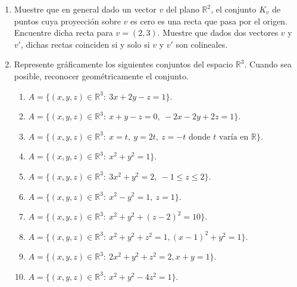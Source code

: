 \documentclass[11pt]{article}
\newcounter{cuent}
\newcommand{\proba}[1]{\stepcounter{cuent}{\alph{cuent})\ }
\displaystyle#1\hfill}
\newcommand{\cuento}{\setcounter{cuent}{0}}
\newcommand{\R}{\mathbb{R}}
\begin{document}
\begin{enumerate}
$\proba{\parallel u + v \parallel} \proba{\text{dist}(u,v)}
\proba{\left<u,v\right>} \proba{\mbox{ el \'angulo entre } u \mbox{ y } v}$\\
$\proba{\mbox{ la recta } r \mbox{ paralela a }u\mbox{ por }(0,1)}  \proba{\mbox{ la recta } s \mbox{ perpendicular a }v\mbox{ por }(0,0)}$\\
$\proba{r\cap s}.$

\cuento

\vspace{0,4cm}

\item Muestre que en general dado un vector $v$ del plano $\R^2$, el conjunto $K_v$ de puntos cuya proyecci\'on sobre $v$ es cero es una recta que pasa por el origen.
Encuentre dicha recta para $v=(2,3)$. Muestre que dados dos vectores $v$ y $v'$, dichas rectas coinciden si y solo si $v$ y $v'$ son colineales. 

\item Represente gr\'aficamente los siguientes conjuntos del espacio $\R^3$. Cuando sea posible, reconocer geom\'etricamente el conjunto. 

\begin{enumerate}

\item $A=\{(x,y,z)\in\R^3:\ 3x+2y-z=1\}$.

\item $A=\{(x,y,z)\in\R^3:\ x+y-z=0,\ -2x-2y+2z=1\}$.

\item $A=\{(x,y,z)\in\R^3:\ x=t,\ y=2t,\ z=-t\mbox{ donde }t\mbox{ var\'ia en }\R\}$.

\item $A=\{(x,y,z)\in\R^3:\ x^2+y^2=1\}$.

\item $A=\{(x,y,z)\in\R^3:\ 3x^2+y^2=2,\ -1\leq z \leq 2\}$.

\item $A=\{(x,y,z)\in\R^3:\ x^2-y^2=1,\ z=1\}$.

\item $A=\{(x,y,z)\in\R^3:\ x^2+y^2+(z-2)^2=10\}$.

\item $A=\{(x,y,z)\in\R^3:\ x^2+y^2+z^2=1, (x-1)^2+y^2=1\}$.

\item $A=\{(x,y,z)\in\R^3:\ 2x^2+y^2+z^2=2, x+y=1\}$.

\item $A=\{(x,y,z)\in\R^3:\ x^2+y^2-4z^2=1\}$.


\end{enumerate}
\end{enumerate}
\end{document}
